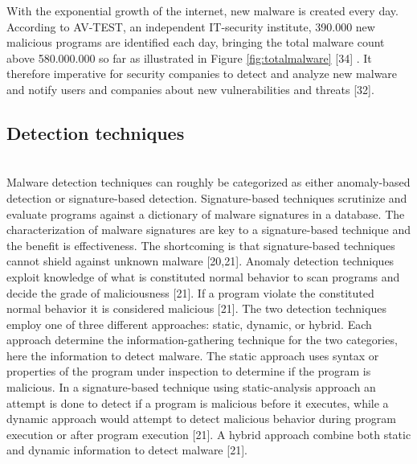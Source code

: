 \documentclass[12pt]{article} %
\begin{document}
With the exponential growth of the internet, new malware is created every day. According to AV-TEST, an independent IT-security institute, 390.000 new malicious programs are identified each day, bringing the total malware count above 580.000.000 so far as illustrated in Figure \ref{fig:totalmalware} [34] . It therefore imperative for security companies to detect and analyze new malware and notify users and companies about new vulnerabilities and threats [32].  
\\
\subsection{Detection techniques}
\\ 
Malware detection techniques can roughly be categorized as either anomaly-based detection or signature-based detection. Signature-based techniques scrutinize and evaluate programs against a dictionary of malware signatures in a database. The characterization of malware signatures are key to a signature-based technique and the benefit is effectiveness. The shortcoming is that signature-based techniques cannot shield against unknown malware [20,21]. Anomaly detection techniques exploit knowledge of what is constituted normal behavior to scan programs and decide the grade of maliciousness [21]. If a program violate the constituted normal behavior it is considered malicious [21]. 
The two detection techniques employ one of three different approaches: static,  dynamic, or hybrid. Each approach determine the information-gathering technique for the two categories, here the information to detect malware. The static approach uses syntax or properties of the program under inspection to determine if the program is malicious. In  a signature-based technique using static-analysis approach an attempt is done to detect if a program is malicious before it executes, while a dynamic approach would attempt to detect malicious behavior during program execution or after program execution [21]. A hybrid approach combine both static and dynamic information to detect malware [21].
\\
\end{document}
